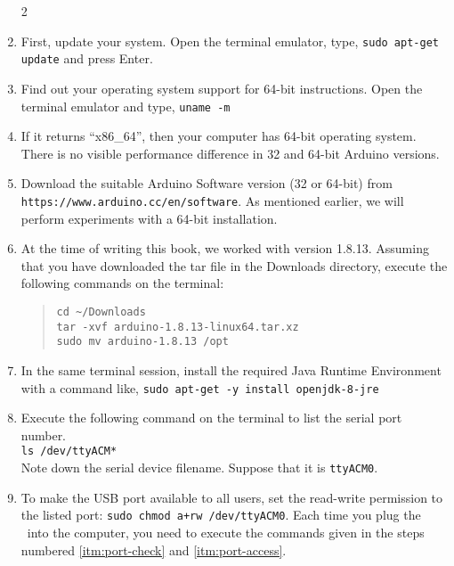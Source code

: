 \begin{enumerate}
      \setcounter{enumi}2
      \item First, update your system. Open the terminal emulator, type,
            {\tt sudo apt-get update} and press Enter. 
      \item Find out your operating system support for 64-bit
            instructions. Open the terminal emulator and type, {\tt uname -m}
      \item If it returns ``x86\_64'', then your computer has 64-bit
            operating system.   There is no visible performance difference in 32
            and 64-bit Arduino versions.
      \item Download the suitable Arduino Software version (32 or 64-bit)
            from \\ {\tt https://www.arduino.cc/en/software}.  As mentioned
            earlier, we will perform experiments with a 64-bit installation.
            
      \item At the time of writing this book, we worked with version 1.8.13.
            Assuming that you have downloaded the tar file in 
            the Downloads directory, execute the following
            commands on the terminal:
            \begin{quote}
                  {\tt cd {\large\textasciitilde}/Downloads\\
                        tar -xvf arduino-1.8.13-linux64.tar.xz\\
                        sudo mv arduino-1.8.13 /opt}
            \end{quote}
            
      \item In the same terminal session, install the required Java Runtime
            Environment with a command like,
            {\tt sudo apt-get -y install openjdk-8-jre}
            
      \item \label{itm:port-check} Execute the
            following command on the terminal to list the serial port number.\\
            {\tt ls /dev/ttyACM*}\\
            Note down the serial device filename.  Suppose that it
            is {\tt ttyACM0}.
      \item \label{itm:port-access} To make the USB port available to all users, set the read-write
            permission to the listed port:
            {\tt sudo chmod a+rw /dev/ttyACM0}. Each time you plug the \arduino\
            into the computer, you need to execute the commands given in the steps 
            numbered \ref{itm:port-check} and \ref{itm:port-access}. 
            

\end{enumerate}
